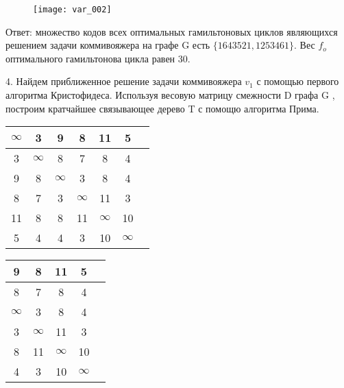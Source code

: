 \documentclass[a4paper,10pt]{article} %
\begin{document}
\newpage


\begin{figure}[!h]
    \centering
    \texttt{[image: var\_002]}
\end{figure}

\bigskip

{\large
Ответ: множество кодов всех оптимальных гамильтоновых циклов являющихся решением задачи коммивояжера на графе G есть $\{1643521, 1253461 \}$. Вес $f_o$ оптимального гамильтонова цикла равен 30.
}

\newpage


4. \quad Найдем приближенное решение задачи коммивояжера $v_1$ с помощью первого алгоритма Кристофидеса. Используя весовую матрицу смежности D графа G , построим кратчайшее связывающее дерево T с помощю алгоритма Прима.

\medskip



\begin{tabular}[]{|c|c|c|c|c|c|c|}
\hline
$\infty$ &    \cellcolor{yellow}3 &    9 &    8 &   11 &    5 \\
\hline
  3 &  $\infty$ &    8 &    7 &    8 &    4 \\
\hline
  9 &    8 &  $\infty$ &    3 &    8 &    4 \\
\hline
  8 &    7 &    3 &  $\infty$ &   11 &    3 \\
\hline
 11 &    8 &    8 &   11 &  $\infty$ &   10 \\
\hline
  5 &    4 &    4 &    3 &   10 &  $\infty$ \\
\hline
\end{tabular}
\hspace{4cm}
\begin{tabular}[]{|c|c|c|c|c|}
\hline
\rowcolor{goodrow}     9 &    8 &   11 &    5 \\
\hline
 \rowcolor{goodrow}     8 &    7 &    8 &    \cellcolor{yellow}4 \\
\hline
  $\infty$ &    3 &    8 &    4 \\
\hline
    3 &  $\infty$ &   11 &    3 \\
\hline
    8 &   11 &  $\infty$ &   10 \\
\hline
    4 &    3 &   10 &  $\infty$ \\
\hline
\end{tabular}

\medskip
\end{document}
